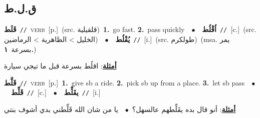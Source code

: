 \documentclass[10pt,a4paper,twoside]{article} %
\begin{document}
\begin{multicols}{2}
\vspace{-3mm}
\subsection*{\color{blue}\foreignlanguage{arabic}{ق.ل.ط}\color{blue}{}} 

{\setlength\topsep{0pt}\textbf{\foreignlanguage{arabic}{قَلَط}}\ {\color{gray}\texttt{//}\color{black}}\ \textsc{verb}\ [p.]\ (src. \color{gray}\foreignlanguage{arabic}{قلقيلية}\color{black})\ \textbf{1.}~go fast.  \textbf{2.}~pass quickly\ \ $\bullet$\ \ \setlength\topsep{0pt}\textbf{\foreignlanguage{arabic}{اُقْلُط}}\ {\color{gray}\texttt{//}\color{black}}\ [c.]\ (src. \color{gray}\foreignlanguage{arabic}{الخليل > الظاهرية > الرماضين}\color{black})\ \ $\bullet$\ \ \setlength\topsep{0pt}\textbf{\foreignlanguage{arabic}{يُقْلُط}}\ {\color{gray}\texttt{//}\color{black}}\ [i.]\ (src. \color{gray}\foreignlanguage{arabic}{طولكرم}\color{black})\ \color{gray}(msa. \foreignlanguage{arabic}{يمر بسرعة}~\foreignlanguage{arabic}{\textbf{١.}})\color{black}\  \begin{flushright}\color{gray}\foreignlanguage{arabic}{\textbf{\underline{\foreignlanguage{arabic}{أمثلة}}}: اقلُط بسرعة قبل ما تيجي سيارة}\end{flushright}\color{black}} \vspace{2mm}

{\setlength\topsep{0pt}\textbf{\foreignlanguage{arabic}{قَلَّط}}\ {\color{gray}\texttt{//}\color{black}}\ \textsc{verb}\ [p.]\ \textbf{1.}~give sb a ride.  \textbf{2.}~pick sb up from a place.  \textbf{3.}~let sb pass\ \ $\bullet$\ \ \setlength\topsep{0pt}\textbf{\foreignlanguage{arabic}{قَلِّط}}\ {\color{gray}\texttt{//}\color{black}}\ [c.]\ \ $\bullet$\ \ \setlength\topsep{0pt}\textbf{\foreignlanguage{arabic}{يقَلِّط}}\ {\color{gray}\texttt{//}\color{black}}\ [i.]\  \begin{flushright}\color{gray}\foreignlanguage{arabic}{\textbf{\underline{\foreignlanguage{arabic}{أمثلة}}}: أنو قال بده يقَلِّطهم عالسهل؟\ $\bullet$\ \  يا من شان الله قَلِّطني بدي أشوف بنتي}\end{flushright}\color{black}} \vspace{2mm}


\end{multicols}
\end{document}
